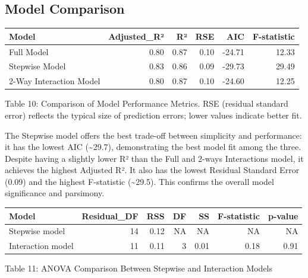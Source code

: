 \documentclass[
  12pt,
]{article}
\begin{document}
\subsection{Model Comparison}\label{model-comparison}

\begingroup\fontsize{8}{10}\selectfont

\begin{longtable}[t]{lrrrrr}
\toprule
Model & Adjusted\_R² & R² & RSE & AIC & F-statistic\\
\midrule
Full Model & 0.80 & 0.87 & 0.10 & -24.71 & 12.33\\
Stepwise Model & 0.83 & 0.86 & 0.09 & -29.73 & 29.49\\
2-Way Interaction Model & 0.80 & 0.87 & 0.10 & -24.60 & 12.25\\
\bottomrule
\end{longtable}
\endgroup{}
\begin{center}
\vspace{-0.5em}
{\fontsize{12}{14}\selectfont Table 10: Comparison of Model Performance Metrics. RSE (residual standard error) reflects the typical size of prediction errors; lower values indicate better fit.\par}
\end{center}

The Stepwise model offers the best trade-off between simplicity and
performance: it has the lowest AIC (\textasciitilde29.7), demonstrating
the best model fit among the three. Despite having a slightly lower R²
than the Full and 2-ways Interactions model, it achieves the highest
Adjusted R². It also has the lowest Residual Standard Error (0.09) and
the highest F-statistic (\textasciitilde29.5). This confirms the overall
model significance and parsimony.

\begin{table}[!h]
\centering\begingroup\fontsize{8}{10}\selectfont

\begin{tabular}{lrrrrrr}
\toprule
Model & Residual\_DF & RSS & DF & SS & F-statistic & p-value\\
\midrule
Stepwise model & 14 & 0.12 & NA & NA & NA & NA\\
Interaction model & 11 & 0.11 & 3 & 0.01 & 0.18 & 0.91\\
\bottomrule
\end{tabular}
\endgroup{}
\end{table}
\begin{center}
\vspace{-1.6em}
{\fontsize{12}{14}\selectfont Table 11: ANOVA Comparison Between Stepwise and Interaction Models\par}
\end{center}
\end{document}
